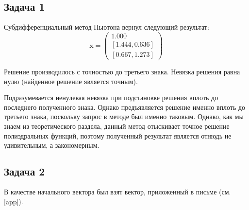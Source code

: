 \subsection{Задача 1}

Субдифференциальный метод Ньютона вернул следующий результат:
\begin{equation}
\mathbf{x} = 
\begin{pmatrix}
1.000 \\
[1.444, 0.636] \\
[0.667, 1.273]
\end{pmatrix}
\end{equation}

Решение производилось с точностью до третьего знака. Невязка решения равна нулю (найденное решение является точным).

\begin{remark}
	Подразумевается ненулевая невязка при подстановке решения вплоть до последнего полученного знака. Однако предъявляется решение именно вплоть до третьего знака, поскольку запрос в методе был именно таковым. Однако, как мы знаем из теоретического раздела, данный метод отыскивает точное решение полиэдральных функций, поэтому полученный результат является отнюдь не удивительным, а закономерным.
\end{remark}

\subsection{Задача 2}

В качестве начального вектора был взят вектор, приложенный в письме (см. \ref{app}).


